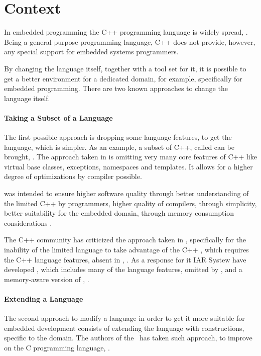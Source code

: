 
\section{Context}

In embedded programming the C++ programming language is widely spread, \cite{embedlangs}. Being a general purpose 
programming language, C++ does not provide, however, any special support for embedded systems programmers. 

By changing  the language itself, together with a tool set for it, it is possible to get a better environment 
for a dedicated domain, for example, specifically for embedded programming. There are two known approaches to change
the language itself.

\paragraph{Taking a Subset of a Language}

The first possible approach is dropping some language features, to get the language, which is simpler. 
As an example, a subset of C++, called  can be brought, \cite{emcpp}. The approach taken in  is 
omitting very many core features of C++ like virtual base classes, exceptions, namespaces and templates. 
It allows for a higher degree of optimizations by compiler possible. 

 was intended to ensure higher software quality through better understanding of the limited 
C++ by programmers, higher quality of compilers, through simplicity, better suitability for the embedded domain, through
memory consumption considerations \cite{stripepp}. 

The C++ community has criticized the approach taken in , specifically for the inability of the 
limited language to take advantage of the C++ , which requires the C++ language features, absent in 
, \cite{stremcpp}. As a response for it IAR Systew have developed , which includes many of the language features,
omitted by , and a memory-aware version of , \cite{extendedembeddedcpp}.

\paragraph{Extending a Language}

The second approach to modify a language in order to get it more suitable for embedded development consists of extending 
the language with constructions, specific to the domain. The authors of the \mbdp\ has taken such approach, to improve on
the C programming language, \cite{2012_voelter_mbeddr_extensible_c_based_language_and_ide_for_embedded}. 

